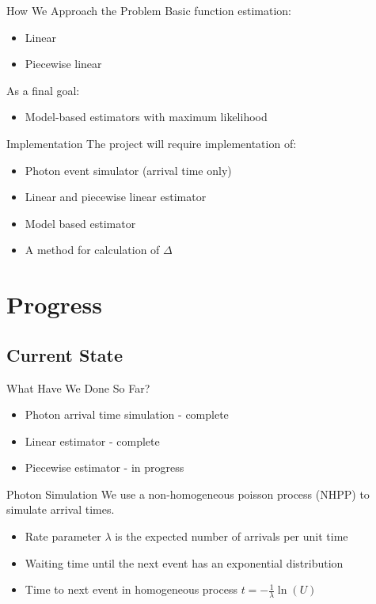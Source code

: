 \documentclass{beamer}
\begin{document}
\begin{frame}{How We Approach the Problem}
  Basic function estimation:
  \begin{itemize}
  \item Linear
  \item Piecewise linear
  \end{itemize}
  As a final goal:
  \begin{itemize}
  \item Model-based estimators with maximum likelihood
  \end{itemize}
\end{frame}

\begin{frame}{Implementation}
  The project will require implementation of:
  \begin{itemize}
  \item<2-> Photon event simulator (arrival time only)
  \item<3-> Linear and piecewise linear estimator
  \item<4-> Model based estimator
  \item<5-> A method for calculation of $\Delta$
  \end{itemize}
\end{frame}

\section{Progress}
\subsection{Current State}

\begin{frame}{What Have We Done So Far?}
  \begin{itemize}
  \item<2-> Photon arrival time simulation - \alert{complete}
  \item<3-> Linear estimator - \alert{complete}
  \item<4-> Piecewise estimator - in progress
  \end{itemize}
\end{frame}

\begin{frame}{Photon Simulation}
  We use a non-homogeneous poisson process (NHPP) to simulate arrival times.
  \begin{itemize}
  \item Rate parameter $\lambda$ is the expected number of arrivals per unit time
  \item Waiting time until the next event has an exponential distribution
  \item Time to next event in homogeneous process $t=-\frac{1}{\lambda}\ln(U)$
  \end{itemize}
\end{frame}
\end{document}
